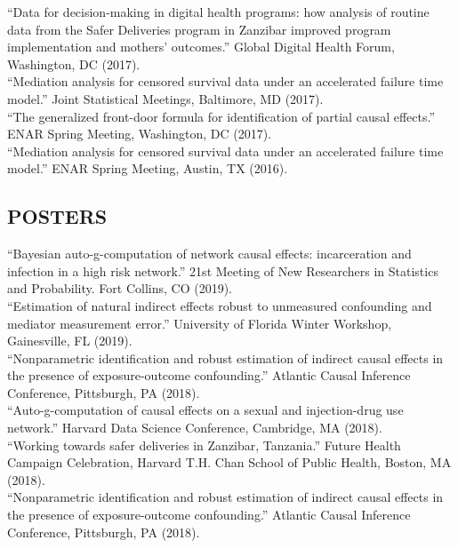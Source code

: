\documentclass[12pt]{article}
\begin{document}
``Data for decision-making in digital health programs: how analysis of routine data from the Safer Deliveries program in Zanzibar improved program implementation and mothers' outcomes.'' Global Digital Health Forum, Washington, DC (2017). \\

``Mediation analysis for censored survival data under an accelerated failure time model.'' Joint Statistical Meetings, Baltimore, MD (2017). \\

``The generalized front-door formula for identification of partial causal effects.'' ENAR Spring Meeting, Washington, DC (2017). \\

``Mediation analysis for censored survival data under an accelerated failure time model.'' ENAR Spring Meeting, Austin, TX (2016). 

\subsection*{\textbf{ POSTERS}}

``Bayesian auto-g-computation of network causal effects: incarceration and infection in a high risk network.'' 21st Meeting of New Researchers in 
Statistics and Probability. Fort Collins, CO (2019). \\

``Estimation of natural indirect effects robust to unmeasured confounding and mediator measurement error.'' University of Florida Winter Workshop, Gainesville, FL (2019). \\

``Nonparametric identification and robust estimation of indirect causal effects in the presence of exposure-outcome confounding.'' Atlantic Causal Inference Conference, Pittsburgh, PA (2018). \\

``Auto-g-computation of causal effects on a sexual and injection-drug use network.'' Harvard Data Science Conference, Cambridge, MA (2018). \\

``Working towards safer deliveries in Zanzibar, Tanzania.'' Future Health Campaign Celebration, Harvard T.H. Chan School of Public Health, Boston, MA (2018). \\

``Nonparametric identification and robust estimation of indirect causal effects in the presence of exposure-outcome confounding.'' Atlantic Causal Inference Conference, Pittsburgh, PA (2018). 
\end{document}
